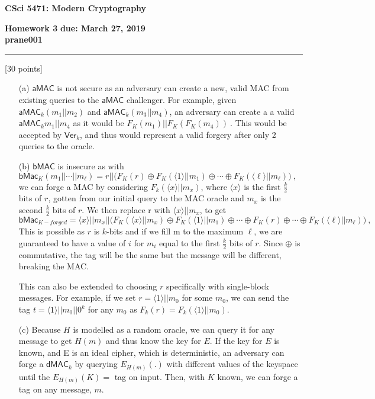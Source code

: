 \documentclass[11pt]{article}
\newcounter{qnum}
\newcommand{\question}[1]{\stepcounter{qnum}\bigskip\noindent{\bf \arabic{qnum}. #1.}}
\newcommand\NetIDa{prane001}
\begin{document}
\begin{center}
{\Large \bf CSci 5471: Modern Cryptography}
\end{center}
{\bf Homework 3} \hfill {\bf due: March 27, 2019}
\medskip
\\
{\bf \NetIDa} \hfill  
\hrule
\medskip
\question{Broken MACs} [30 points]
\begin{itemize}
\item[(a)] $\textsf{aMAC}$  is not secure as an adversary can create a new, valid MAC from
  existing queries to the $\textsf{aMAC}$ challenger. For example, given 
  $\textsf{aMAC}_k(m_1 || m_2)$ and $\textsf{aMAC}_k(m_3 || m_4)$, an adversary can create  a
  a valid $\textsf{aMAC}_k{m_1 || m_4}$ as it would be $ F_K(m_1) ||  F_K(F_K(m_4))\ .$ This 
  would be accepted by $\textsf{Ver}_k$, and thus would represent a valid forgery after only 
  2 queries to the oracle.
\item[(b)] $\textsf{bMAC}$ is insecure as with $\textsf{bMac}_K(m_1 || \cdots ||
  m_\ell) = r || \bigl( F_K(r) \oplus F_K(\langle 1 \rangle || m_1) \oplus
  \cdots \oplus F_K(\langle \ell \rangle || m_\ell) \bigr) \ ,$ we can forge a MAC by 
  considering $F_k(\langle x \rangle || m_x)$, where $\langle x \rangle$ is the first
  $\frac{k}{2}$ bits of $r$, gotten from our initial query to the MAC oracle and $m_x$ is the 
  second $\frac{k}{2}$ bits of $r$. We then replace r with $\langle x \rangle || m_x$, to get
  $$\textsf{bMac}_{K - forged} = \langle x \rangle || m_x || \bigl( F_K(\langle x \rangle || m_x)
    \oplus
    F_K(\langle 1 \rangle || m_1) \oplus \cdots \oplus F_K(r) \oplus \cdots \oplus 
  F_K(\langle \ell \rangle || m_\ell) \bigr) \ ,$$
  This is possible as $r$ is $k$-bits and if we fill m to the maximum $\ell$, we are guaranteed
  to have a value of $i$ for $m_i$ equal to the first $\frac{k}{2}$ bits of $r$. Since $\oplus$ is
  commutative, the tag will be the same but the message will be different, breaking the MAC.

  This can also be extended to choosing $r$ specifically with single-block messages. For example,
  if we set $r=\langle 1\rangle || m_0$ for some $m_0$, we can send the tag
  $t = \langle 1\rangle || m_0 || 0^k$ for any $m_0$ as $F_k(r) = F_k(\langle 1\rangle || m_0).$

\item[(c)] Because $H$ is modelled as a random oracle, we can query it for any message to
  get $H(m)$ and thus know the key for $E$. If the key for $E$ is known, and E is an
  ideal cipher, which is deterministic, an adversary can forge a $\textsf{dMAC}_k$ by 
querying $E_{H(m)}(.)$ with different values of the keyspace until the $E_{H(m)}(K) =$ 
tag on input. Then, with $K$ known, we can forge a tag on any message, $m$.
\end{itemize}
\end{document}
